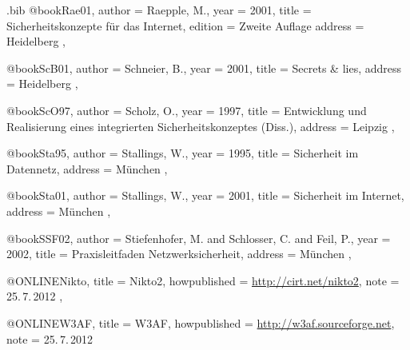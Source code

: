 \begin{filecontents}{\jobname.bib}
@book{Rae01,
    author = {Raepple, M.},
    year = {2001},
    title = {Sicherheitskonzepte für das Internet},
    edition = {Zweite Auflage}
    address = {Heidelberg}
},

@book{ScB01,
    author = {Schneier, B.},
    year = {2001},
    title = {Secrets \& lies},
    address = {Heidelberg}
},

@book{ScO97,
    author = {Scholz, O.},
    year = {1997},
    title = {Entwicklung und Realisierung eines integrierten Sicherheitskonzeptes (Diss.)},
    address = {Leipzig}
},

@book{Sta95,
    author = {Stallings, W.},
    year = {1995},
    title = {Sicherheit im Datennetz},
    address = {München}
},

@book{Sta01,
    author = {Stallings, W.},
    year = {2001},
    title = {Sicherheit im Internet},
    address = {München}
},

@book{SSF02,
    author = {Stiefenhofer, M. and Schlosser, C. and Feil, P.},
    year = {2002},
    title = {Praxisleitfaden Netzwerksicherheit},
    address = {München}
},

@ONLINE{Nikto,
  title = {Nikto2},
  howpublished = {\url{http://cirt.net/nikto2}},
  note = {25.\,7.\,2012}
},

@ONLINE{W3AF,
  title = {W3AF},
  howpublished = {\url{http://w3af.sourceforge.net}},
  note = {25.\,7.\,2012}
}

\end{filecontents}
